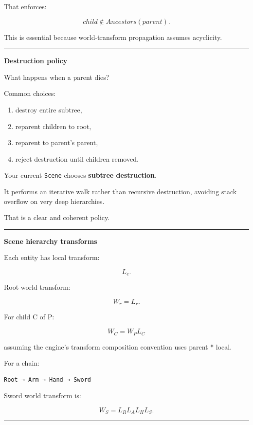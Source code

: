 That enforces:

\[
child\notin Ancestors(parent).
\]

This is essential because world-transform propagation assumes acyclicity.

\begin{center}\rule{0.5\linewidth}{0.5pt}\end{center}

\textbf{Destruction policy}

What happens when a parent dies?

Common choices:

\begin{enumerate}
\def\labelenumi{\arabic{enumi}.}
\tightlist
\item
  destroy entire subtree,
\item
  reparent children to root,
\item
  reparent to parent's parent,
\item
  reject destruction until children removed.
\end{enumerate}

Your current \texttt{Scene} chooses \textbf{subtree destruction}.

It performs an iterative walk rather than recursive destruction, avoiding stack overflow on very deep hierarchies.

That is a clear and coherent policy.

\begin{center}\rule{0.5\linewidth}{0.5pt}\end{center}

\textbf{Scene hierarchy transforms}

Each entity has local transform:

\[
L_e.
\]

Root world transform:

\[
W_r=L_r.
\]

For child C of P:

\[
\boxed{
W_C=W_P L_C
}
\]

assuming the engine's transform composition convention uses parent * local.

For a chain:

\begin{verbatim}
Root → Arm → Hand → Sword
\end{verbatim}

Sword world transform is:

\[
W_S=
L_RL_AL_HL_S.
\]

\begin{center}\rule{0.5\linewidth}{0.5pt}\end{center}

